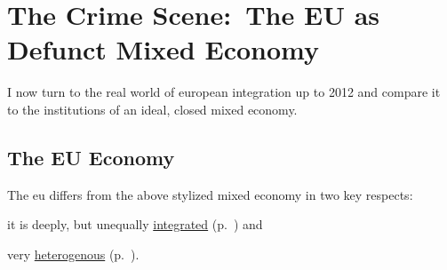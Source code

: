 


\section{The Crime Scene:\ The EU as Defunct Mixed Economy}
	\label{sec:EU-reality}
I now turn to the real world of european integration up to 2012 and compare it to the institutions of an ideal, closed mixed economy.

\subsection{The EU Economy}
The \gls{eu} differs from the above stylized mixed economy in two key respects:
\begin{inparaenum}
	\item it is deeply, but unequally \hyperref[sec:EU-Acquis]{integrated} (p.~\pageref{sec:EU-Acquis}) and
	\item very \hyperref[sec:sources-of-wealth]{heterogenous} (p.~\pageref{sec:sources-of-wealth}).
\end{inparaenum}

